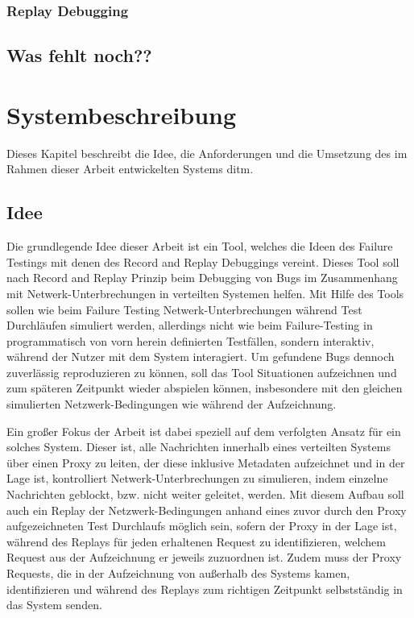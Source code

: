 \documentclass[12pt,a4paper]{report}
\begin{document}
\subsection{Replay Debugging}
\cite{distributed_replay_debugging_1997}

\section{Was fehlt noch??}

\chapter{Systembeschreibung}
Dieses Kapitel beschreibt die Idee, die Anforderungen und die Umsetzung des im Rahmen dieser Arbeit entwickelten Systems ditm.
\section{Idee}
Die grundlegende Idee dieser Arbeit ist ein Tool, welches die Ideen des Failure Testings mit denen des Record and Replay
Debuggings vereint. Dieses Tool soll nach Record and Replay Prinzip beim Debugging von Bugs im Zusammenhang mit
Netwerk-Unterbrechungen in verteilten Systemen helfen. Mit Hilfe des Tools sollen wie beim Failure Testing Netwerk-Unterbrechungen
während Test Durchläufen simuliert werden, allerdings nicht wie beim Failure-Testing in programmatisch von vorn herein definierten
Testfällen, sondern interaktiv, während der Nutzer mit dem System interagiert. Um gefundene Bugs dennoch zuverlässig reproduzieren
zu können, soll das Tool Situationen aufzeichnen und zum späteren Zeitpunkt wieder abspielen können, insbesondere mit den gleichen
simulierten Netzwerk-Bedingungen wie während der Aufzeichnung.

Ein großer Fokus der Arbeit ist dabei speziell auf dem verfolgten Ansatz für ein solches System. Dieser ist, alle Nachrichten
innerhalb eines verteilten Systems über einen Proxy zu leiten, der diese inklusive Metadaten aufzeichnet und in der Lage ist,
kontrolliert Netwerk-Unterbrechungen zu simulieren, indem einzelne Nachrichten geblockt, bzw. nicht weiter geleitet, werden.  Mit
diesem Aufbau soll auch ein Replay der Netzwerk-Bedingungen anhand eines zuvor durch den Proxy aufgezeichneten Test Durchlaufs
möglich sein, sofern der Proxy in der Lage ist, während des Replays für jeden erhaltenen Request zu identifizieren, welchem
Request aus der Aufzeichnung er jeweils zuzuordnen ist. Zudem muss der Proxy Requests, die in der Aufzeichnung von außerhalb des
Systems kamen, identifizieren und während des Replays zum richtigen Zeitpunkt selbstständig in das System senden.
\end{document}
